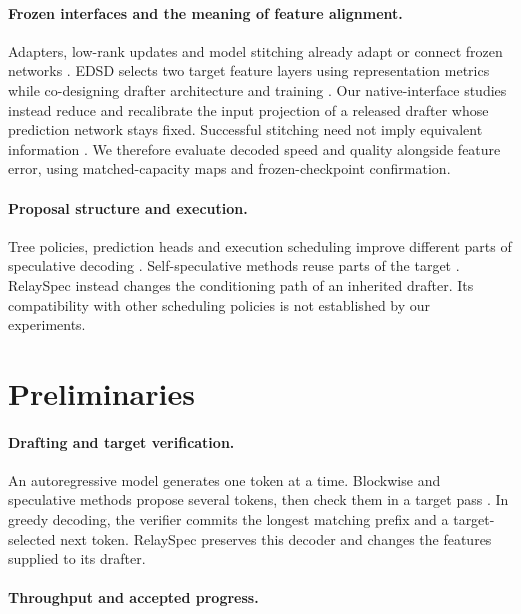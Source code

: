 \documentclass{article}
\begin{document}
\paragraph{Frozen interfaces and the meaning of feature alignment.}
Adapters, low-rank updates and model stitching already adapt or connect
frozen networks \citep{houlsby2019adapters,hu2022lora,bansal2021stitching}.
EDSD selects two target feature layers using representation metrics while
co-designing drafter architecture and training \citep{cheng2026edsd}.
Our native-interface studies instead reduce and recalibrate the input
projection of a released drafter whose prediction network stays fixed.
Successful stitching need not imply equivalent information
\citep{smith2025stitching}. We therefore evaluate decoded speed and quality alongside feature
error, using matched-capacity maps and frozen-checkpoint confirmation.

\paragraph{Proposal structure and execution.}
Tree policies, prediction heads and execution scheduling improve different
parts of speculative decoding \citep{cai2024medusa,li2024eagle2,wang2025opttree,miao2024specinfer,kumar2026ssd}.
Self-speculative methods reuse parts of the target
\citep{zhang2024draftverify,elhoushi2024layerskip}. RelaySpec instead
changes the conditioning path of an inherited drafter. Its compatibility
with other scheduling policies is not established by our experiments.

\section{Preliminaries}
\label{sec:preliminaries}
\paragraph{Drafting and target verification.}
An autoregressive model generates one token at a time. Blockwise and
speculative methods propose several tokens, then check them in a target
pass \citep{stern2018blockwise,xia2023specdec,leviathan2023speculative}.
In greedy decoding, the verifier commits the longest matching prefix
and a target-selected next token. RelaySpec preserves this decoder and
changes the features supplied to its drafter.

\paragraph{Throughput and accepted progress.}
\label{sec:cost}
\end{document}
